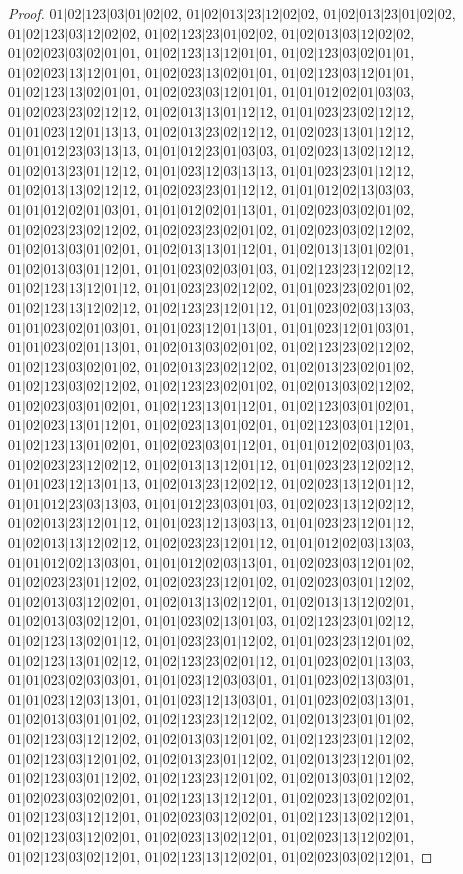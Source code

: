 \documentclass[12pt]{article}
\theoremstyle{plain}
\theoremstyle{definition}
\theoremstyle{remark}
\begin{document}
\begin{proof}
$01|02|123|03|01|02|02$, $01|02|013|23|12|02|02$, $01|02|013|23|01|02|02$, $01|02|123|03|12|02|02$, $01|02|123|23|01|02|02$, $01|02|013|03|12|02|02$, $01|02|023|03|02|01|01$, $01|02|123|13|12|01|01$, $01|02|123|03|02|01|01$, $01|02|023|13|12|01|01$, $01|02|023|13|02|01|01$, $01|02|123|03|12|01|01$, $01|02|123|13|02|01|01$, $01|02|023|03|12|01|01$, $01|01|012|02|01|03|03$, $01|02|023|23|02|12|12$, $01|02|013|13|01|12|12$, $01|01|023|23|02|12|12$, $01|01|023|12|01|13|13$, $01|02|013|23|02|12|12$, $01|02|023|13|01|12|12$, $01|01|012|23|03|13|13$, $01|01|012|23|01|03|03$, $01|02|023|13|02|12|12$, $01|02|013|23|01|12|12$, $01|01|023|12|03|13|13$, $01|01|023|23|01|12|12$, $01|02|013|13|02|12|12$, $01|02|023|23|01|12|12$, $01|01|012|02|13|03|03$, $01|01|012|02|01|03|01$, $01|01|012|02|01|13|01$, $01|02|023|03|02|01|02$, $01|02|023|23|02|12|02$, $01|02|023|23|02|01|02$, $01|02|023|03|02|12|02$, $01|02|013|03|01|02|01$, $01|02|013|13|01|12|01$, $01|02|013|13|01|02|01$, $01|02|013|03|01|12|01$, $01|01|023|02|03|01|03$, $01|02|123|23|12|02|12$, $01|02|123|13|12|01|12$, $01|01|023|23|02|12|02$, $01|01|023|23|02|01|02$, $01|02|123|13|12|02|12$, $01|02|123|23|12|01|12$, $01|01|023|02|03|13|03$, $01|01|023|02|01|03|01$, $01|01|023|12|01|13|01$, $01|01|023|12|01|03|01$, $01|01|023|02|01|13|01$, $01|02|013|03|02|01|02$, $01|02|123|23|02|12|02$, $01|02|123|03|02|01|02$, $01|02|013|23|02|12|02$, $01|02|013|23|02|01|02$, $01|02|123|03|02|12|02$, $01|02|123|23|02|01|02$, $01|02|013|03|02|12|02$, $01|02|023|03|01|02|01$, $01|02|123|13|01|12|01$, $01|02|123|03|01|02|01$, $01|02|023|13|01|12|01$, $01|02|023|13|01|02|01$, $01|02|123|03|01|12|01$, $01|02|123|13|01|02|01$, $01|02|023|03|01|12|01$, $01|01|012|02|03|01|03$, $01|02|023|23|12|02|12$, $01|02|013|13|12|01|12$, $01|01|023|23|12|02|12$, $01|01|023|12|13|01|13$, $01|02|013|23|12|02|12$, $01|02|023|13|12|01|12$, $01|01|012|23|03|13|03$, $01|01|012|23|03|01|03$, $01|02|023|13|12|02|12$, $01|02|013|23|12|01|12$, $01|01|023|12|13|03|13$, $01|01|023|23|12|01|12$, $01|02|013|13|12|02|12$, $01|02|023|23|12|01|12$, $01|01|012|02|03|13|03$, $01|01|012|02|13|03|01$, $01|01|012|02|03|13|01$, $01|02|023|03|12|01|02$, $01|02|023|23|01|12|02$, $01|02|023|23|12|01|02$, $01|02|023|03|01|12|02$, $01|02|013|03|12|02|01$, $01|02|013|13|02|12|01$, $01|02|013|13|12|02|01$, $01|02|013|03|02|12|01$, $01|01|023|02|13|01|03$, $01|02|123|23|01|02|12$, $01|02|123|13|02|01|12$, $01|01|023|23|01|12|02$, $01|01|023|23|12|01|02$, $01|02|123|13|01|02|12$, $01|02|123|23|02|01|12$, $01|01|023|02|01|13|03$, $01|01|023|02|03|03|01$, $01|01|023|12|03|03|01$, $01|01|023|02|13|03|01$, $01|01|023|12|03|13|01$, $01|01|023|12|13|03|01$, $01|01|023|02|03|13|01$, $01|02|013|03|01|01|02$, $01|02|123|23|12|12|02$, $01|02|013|23|01|01|02$, $01|02|123|03|12|12|02$, $01|02|013|03|12|01|02$, $01|02|123|23|01|12|02$, $01|02|123|03|12|01|02$, $01|02|013|23|01|12|02$, $01|02|013|23|12|01|02$, $01|02|123|03|01|12|02$, $01|02|123|23|12|01|02$, $01|02|013|03|01|12|02$, $01|02|023|03|02|02|01$, $01|02|123|13|12|12|01$, $01|02|023|13|02|02|01$, $01|02|123|03|12|12|01$, $01|02|023|03|12|02|01$, $01|02|123|13|02|12|01$, $01|02|123|03|12|02|01$, $01|02|023|13|02|12|01$, $01|02|023|13|12|02|01$, $01|02|123|03|02|12|01$, $01|02|123|13|12|02|01$, $01|02|023|03|02|12|01$, 
\end{proof}
\end{document}
